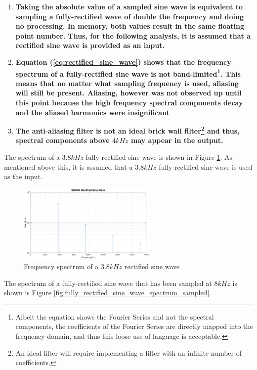 \documentclass{article}
\begin{document}
\begin{enumerate}
    \item \textbf{Taking the absolute value of a sampled sine wave is equivalent to sampling a fully-rectified wave of double the frequency and doing no processing. In memory, both values result in the same floating point number. Thus, for the following analysis, it is assumed that a rectified sine wave is provided as an input.}
    \item \textbf{Equation (\ref{eq:rectified_sine_wave}) shows that the frequency spectrum of a fully-rectified sine wave is not band-limited\footnote{Albeit the equation shows the Fourier Series and not the spectral components, the coefficients of the Fourier Series are directly mapped into the frequency domain, and thus this loose use of language is acceptable.}. This means that no matter what sampling frequency is used, aliasing will still be present. Aliasing, however was not observed up until this point because the high frequency spectral components decay and the aliased harmonics were insignificant}  
    \item \textbf{The anti-aliasing filter is not an ideal brick wall filter\footnote{An ideal filter will require implementing a filter with an infinite number of coefficients.} and thus, spectral components above $4kHz$ may appear in the output.}
\end{enumerate}


The spectrum of a $3.8kHz$ fully-rectified sine wave is shown in Figure \ref{fig:fully_rectified_sine_wave_spectrum}. As mentioned above this, it is assumed that a $3.8kHz$ fully-rectified sine wave is used as the input. 

\begin{figure}[H]
    \centering
    \includegraphics[width=0.6\textwidth]{3800Hz_rectified_sine_wave_not_sampled}
    \caption{Frequency spectrum of a $3.8kHz$ rectified sine wave}
    \label{fig:fully_rectified_sine_wave_spectrum}
\end{figure}

The spectrum of a fully-rectified sine wave that has been sampled at $8kHz$ is shown is Figure \ref{fig:fully_rectified_sine_wave_spectrum_sampled}.
\end{document}
